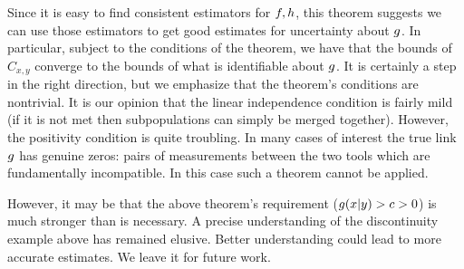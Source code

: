 Since it is easy to find consistent estimators for $f,h$, this theorem suggests we can use those estimators to get good estimates for uncertainty about $g$.  In particular, subject to the conditions of the theorem, we have that the bounds of $C_{x,y}$ converge to the bounds of what is identifiable about $g$.  It is certainly a step in the right direction, but we emphasize that the theorem's conditions are nontrivial.  It is our opinion that the linear independence condition is fairly mild (if it is not met then subpopulations can simply be merged together).  However, the positivity condition is quite troubling.  In many cases of interest the true link $g$ has genuine zeros: pairs of measurements between the two tools which are fundamentally incompatible.  In this case such a theorem cannot be applied.  

However, it may be that the above theorem's requirement ($g(x|y)>c>0$) is much stronger than is necessary.  A precise understanding of the discontinuity example above has remained elusive.  Better understanding could lead to more accurate estimates.  We leave it for future work.









































